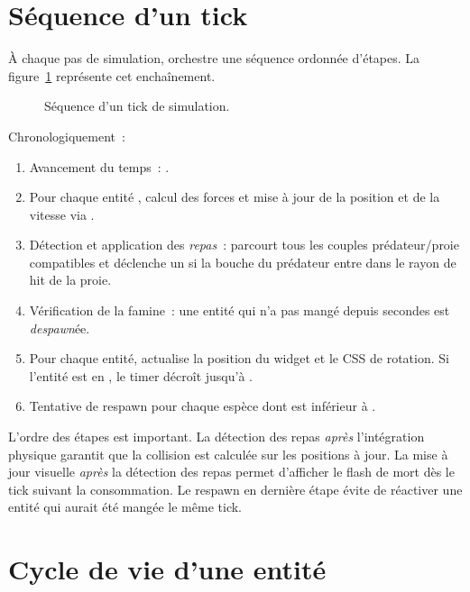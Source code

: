 \section{Séquence d'un tick}

À chaque pas de simulation,  orchestre une
séquence ordonnée d'étapes. La figure~\ref{fig:tick-sequence}
représente cet enchaînement.

\begin{figure}[h!]
\centering
\resizebox{0.85\textwidth}{!}{}
\caption{Séquence d'un tick de simulation.}
\label{fig:tick-sequence}
\end{figure}

Chronologiquement~:

\begin{enumerate}
  \item Avancement du temps~: .
  \item Pour chaque entité , calcul des forces et
    mise à jour de la position et de la vitesse via
    .
  \item Détection et application des \emph{repas}~:
     parcourt tous les couples
    prédateur/proie compatibles et déclenche un
     si la bouche du prédateur entre dans
    le rayon de hit de la proie.
  \item Vérification de la famine~: une entité qui n'a pas
    mangé depuis  secondes est
    \emph{despawn}ée.
  \item Pour chaque entité, 
    actualise la position du widget et le CSS de rotation. Si
    l'entité est en , le timer décroît jusqu'à
    .
  \item Tentative de respawn pour chaque espèce dont
     est inférieur à .
\end{enumerate}

L'ordre des étapes est important. La détection des repas
\emph{après} l'intégration physique garantit que la collision
est calculée sur les positions à jour. La mise à jour visuelle
\emph{après} la détection des repas permet d'afficher le flash
de mort dès le tick suivant la consommation. Le respawn en
dernière étape évite de réactiver une entité qui aurait été
mangée le même tick.

\section{Cycle de vie d'une entité}

